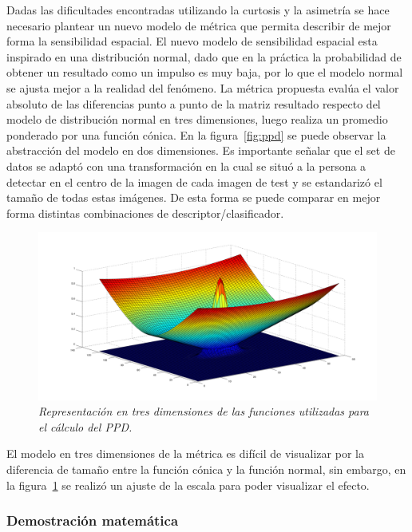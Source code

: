 Dadas las dificultades encontradas utilizando la curtosis y la asimetría se hace necesario plantear un nuevo modelo de métrica que  permita describir de mejor forma la sensibilidad espacial. El nuevo modelo de sensibilidad espacial esta inspirado en una distribución normal, dado que en la práctica la probabilidad de obtener un resultado como un impulso es muy baja, por lo que el modelo normal se ajusta mejor a la realidad del fenómeno. La métrica propuesta evalúa el valor absoluto de las diferencias punto a punto de la matriz resultado respecto del modelo de distribución normal en tres dimensiones, luego realiza un promedio ponderado por una función cónica. En la figura~\ref{fig:ppd} se puede observar la abstracción del modelo en dos dimensiones. Es importante señalar que el set de datos se adaptó con una transformación en la cual se situó a la persona a detectar en el centro de la imagen de cada imagen de test y se estandarizó el tamaño de todas estas imágenes. De esta forma se puede comparar en mejor forma distintas combinaciones de descriptor/clasificador.

\begin{figure}[htc]
  \centering
  \includegraphics[scale=.3]{images/metrica}
  \caption{\em Representación en tres dimensiones de las funciones utilizadas para el cálculo del PPD.}  
  \label{fig:ppd3d}
\end{figure}

El modelo en tres dimensiones de la métrica es difícil de visualizar por la diferencia de tamaño entre la función cónica y la función normal, sin embargo, en la figura~\ref{fig:ppd3d} se realizó un ajuste de la escala para poder visualizar el efecto.

\subsubsection{Demostración matemática}
\label{sec:dem}

